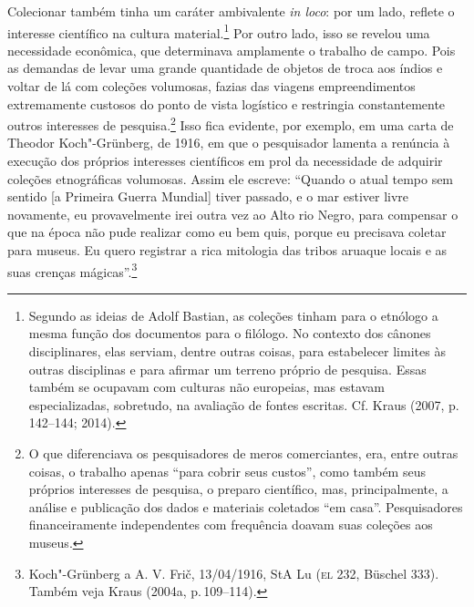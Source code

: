 Colecionar também tinha um caráter ambivalente \textit{in loco}: por um
lado, reflete o interesse científico na cultura material.\footnote{Segundo
  as ideias de Adolf Bastian, as coleções tinham para o etnólogo a mesma
  função dos documentos para o filólogo. No contexto dos cânones
  disciplinares, elas serviam, dentre outras coisas, para estabelecer
  limites às outras disciplinas e para afirmar um terreno próprio de
  pesquisa. Essas também se ocupavam com culturas não europeias, mas
  estavam especializadas, sobretudo, na avaliação de fontes escritas.
  Cf. Kraus (2007, p.\,142--144; 2014).} Por outro lado, isso se revelou
uma necessidade econômica, que determinava amplamente o trabalho de
campo. Pois as demandas de levar uma grande quantidade de objetos de
troca aos índios e voltar de lá com coleções volumosas, fazias das
viagens empreendimentos extremamente custosos do ponto de vista
logístico e restringia constantemente outros interesses de
pesquisa.\footnote{O que diferenciava os pesquisadores de meros
  comerciantes, era, entre outras coisas, o trabalho apenas ``para
  cobrir seus custos'', como também seus próprios interesses de
  pesquisa, o preparo científico, mas, principalmente, a análise e
  publicação dos dados e materiais coletados ``em casa''. Pesquisadores
  financeiramente independentes com frequência doavam suas coleções aos
  museus.} Isso fica evidente, por exemplo, em uma carta de Theodor
Koch"-Grünberg, de 1916, em que o pesquisador lamenta a renúncia à
execução dos próprios interesses científicos em prol da necessidade de
adquirir coleções etnográficas volumosas. Assim ele escreve: ``Quando o
atual tempo sem sentido {[}a Primeira Guerra Mundial{]} tiver passado,
e o mar estiver livre novamente, eu provavelmente irei outra vez ao Alto
rio Negro, para compensar o que na época não pude realizar como eu bem
quis, porque eu precisava coletar para museus. Eu quero registrar a
rica mitologia das tribos aruaque locais e as suas crenças
mágicas''.\footnote{Koch"-Grünberg a A. V. Frič, 13/04/1916, StA Lu (\textsc{el}
  232, Büschel 333). Também veja Kraus (2004a, p.\,109--114).}

